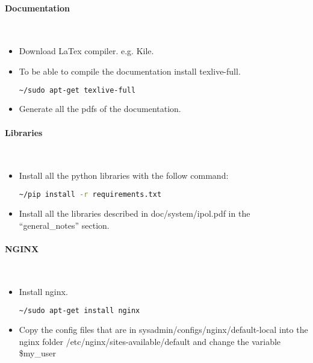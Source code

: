 \paragraph{Documentation} \hspace{0pt} \\
\begin{itemize}
 \item Download LaTex compiler. e.g. Kile.
 \item To be able to compile the documentation install texlive-full.
  \begin{lstlisting}[language=Bash]
  ~/sudo apt-get texlive-full
  \end{lstlisting}
 \item Generate all the pdfs of the documentation.
\end{itemize}

\paragraph{Libraries} \hspace{0pt} \\
\begin{itemize}
 \item Install all the python libraries with the follow command:
  \begin{lstlisting}[language=Bash]
  ~/pip install -r requirements.txt
  \end{lstlisting}
 \item Install all the libraries described in doc/system/ipol.pdf in the ``general\_notes'' section.
\end{itemize}

\paragraph{NGINX} \hspace{0pt} \\
\begin{itemize}
 \item Install nginx.
  \begin{lstlisting}[language=Bash]
  ~/sudo apt-get install nginx
  \end{lstlisting}
 \item Copy the config files that are in sysadmin/configs/nginx/default-local into the nginx folder /etc/nginx/sites-available/default and change the variable \$my\_user
\end{itemize}


